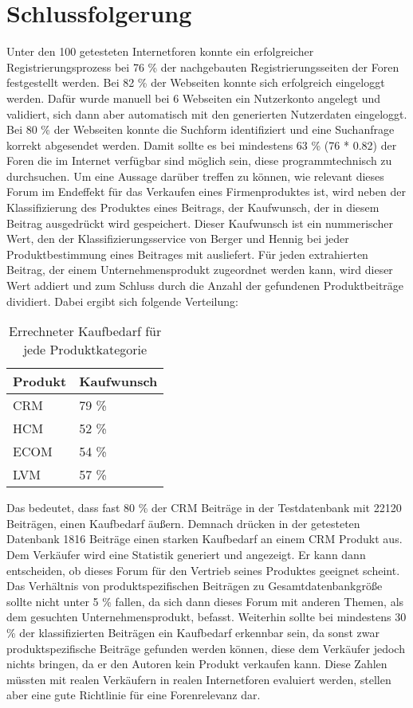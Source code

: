 \section{Schlussfolgerung}
Unter den 100 getesteten Internetforen konnte ein erfolgreicher Registrierungsprozess bei 76 \% der nachgebauten Registrierungsseiten der Foren festgestellt werden. Bei 82 \% der Webseiten konnte sich erfolgreich eingeloggt werden. Dafür wurde manuell bei 6 Webseiten ein Nutzerkonto angelegt und validiert, sich dann aber automatisch mit den generierten Nutzerdaten eingeloggt. Bei 80 \% der Webseiten konnte die Suchform identifiziert und eine Suchanfrage korrekt abgesendet werden. Damit sollte es bei mindestens 63 \% (76 * 0.82) der Foren die im Internet verfügbar sind möglich sein, diese programmtechnisch zu durchsuchen.
Um eine Aussage darüber treffen zu können, wie relevant dieses Forum im Endeffekt für das Verkaufen eines Firmenproduktes ist, wird neben der Klassifizierung des Produktes eines Beitrags, der Kaufwunsch, der in diesem Beitrag ausgedrückt wird gespeichert. Dieser Kaufwunsch ist ein nummerischer Wert, den der Klassifizierungsservice von Berger und Hennig \cite{n2o} bei jeder Produktbestimmung eines Beitrages mit ausliefert. Für jeden extrahierten Beitrag, der einem Unternehmensprodukt zugeordnet werden kann, wird dieser Wert addiert und zum Schluss durch die Anzahl der gefundenen Produktbeiträge dividiert. Dabei ergibt sich folgende Verteilung: 

\begin{table}[h!]
\centering
\begin{tabular}{ | p{3cm} | l |}
\hline
Produkt & Kaufwunsch\\ \hline
CRM & 79 \% \\ \hline
HCM & 52 \% \\ \hline
ECOM & 54 \% \\ \hline
LVM & 57 \% \\ \hline
\end{tabular}
\caption{Errechneter Kaufbedarf für jede Produktkategorie}
\end{table}

Das bedeutet, dass fast 80 \% der CRM Beiträge in der Testdatenbank mit 22120 Beiträgen, einen Kaufbedarf äußern. Demnach drücken in der getesteten Datenbank 1816 Beiträge einen starken Kaufbedarf an einem CRM Produkt aus. Dem Verkäufer wird eine Statistik generiert und angezeigt. Er kann dann entscheiden, ob dieses Forum für den Vertrieb seines Produktes geeignet scheint. Das Verhältnis von produktspezifischen Beiträgen zu Gesamtdatenbankgröße sollte nicht unter 5 \% fallen, da sich dann dieses Forum mit anderen Themen, als dem gesuchten Unternehmensprodukt, befasst. Weiterhin sollte bei mindestens 30 \% der klassifizierten Beiträgen ein Kaufbedarf erkennbar sein, da sonst zwar produktspezifische Beiträge gefunden werden können, diese dem Verkäufer jedoch nichts bringen, da er den Autoren kein Produkt verkaufen kann. Diese Zahlen müssten mit realen Verkäufern in realen Internetforen evaluiert werden, stellen aber eine gute Richtlinie für eine Forenrelevanz dar.


